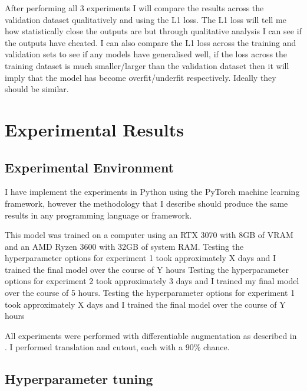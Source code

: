 \documentclass{UoYCSproject}
\begin{document}
After performing all 3 experiments I will compare the results across the validation dataset qualitatively and using the L1 loss. The L1 loss will tell me how statistically close the outputs are but through qualitative analysis I can see if the outputs have cheated. 
I can also compare the L1 loss across the training and validation sets to see if any models have generalised well, if the loss across the training dataset is much smaller/larger than the validation dataset then it will imply that the model has become overfit/underfit respectively. Ideally they should be similar. 

\newpage{}

\chapter{Experimental Results}



\section{Experimental Environment}

I have implement the experiments in Python using the PyTorch machine learning framework, however the methodology that I describe should produce the same results in any programming language or framework.

This model was trained on a computer using an RTX 3070 with 8GB of VRAM and an AMD Ryzen 3600 with 32GB of system RAM.
Testing the hyperparameter options for experiment 1 took approximately X days and I trained the final model over the course of Y hours
Testing the hyperparameter options for experiment 2 took approximately 3 days and I trained my final model over the course of 5 hours.
Testing the hyperparameter options for experiment 1 took approximately X days and I trained the final model over the course of Y hours

All experiments were performed with differentiable augmentation as described in \cite{zhao2020differentiable}. I performed translation and cutout, each with a 90\% chance.

\section{Hyperparameter tuning}
\end{document}
